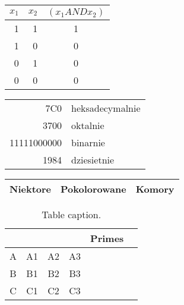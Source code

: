 \documentclass[a4paper,11pt]{article}
\begin{document}
\begin{tabular}{r|r|c} \hline
\hline
$x_{1}$ & $x_{2}$ & $(x_{1}AND x_{2})$ \\ \hline
1 & 1 & 1\\
1 & 0 & 0\\
0 & 1 & 0\\
0 & 0 & 0 \\
\hline \hline
\end{tabular}
\newpage

\begin{tabular}{|r|l|} \hline
7C0 & heksadecymalnie \\
3700 & oktalnie \\
11111000000 & binarnie \\
\hline \hline
1984 & dziesietnie \\ \hline
\end{tabular}

\newpage
\begin{tabular}{l|c|r}
  \hline
 Niektore & \cellcolor{red}Pokolorowane & Komory \\
  \hline
	\end{tabular}
	\newpage
	
\begin{table}
\begin{center}
\begin{tabular}{|c|c|c|c|c|c|}
\cline{5-5}
\multicolumn{4}{c|}{}{}{} & Primes \\
\hline
A & A1 & A2 & A3 \\
\hline
B & B1 & B2 & B3 \\
\hline
C & C1 & C2 & C3 \\
\hline
\end{tabular}
\end{center}
\caption{Table caption.}
\label{Table1}
\end{table}

	
\end{document}

